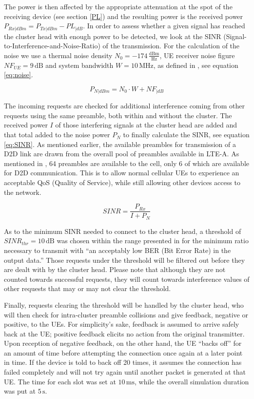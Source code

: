 The power is then affected by the appropriate attenuation at the spot of the receiving device (see section \ref{PL}) and the resulting power is the received power $P_{Rx|dBm} = P_{Tx|dBm} - PL_{|dB}$. In order to assess whether a given signal has reached the cluster head with enough power to be detected, we look at the SINR (Signal-to-Interference-and-Noise-Ratio) of the transmission. For the calculation of the noise we use a thermal noise density $N_0 = -174\,\frac{\text{dBm}}{\text{Hz}}$, UE receiver noise figure $NF_{UE} = 9\,\text{dB}$ and system bandwidth $W = 10\,\text{MHz}$, as defined in \cite{3rdGenerationPartnershipProject;2012}, see equation \ref{eq:noise}.

\begin{equation}\label{eq:noise}
P_{N|dBm} = N_0 \cdot W + NF_{|dB}
\end{equation} 

The incoming requests are checked for additional interference coming from other requests using the same preamble, both within and without the cluster. The received power $I$ of those interfering signals at the cluster head are added and that total added to the noise power $P_N$ to finally calculate the SINR, see equation \ref{eq:SINR}. As mentioned earlier, the available preambles for transmission of a D2D link are drawn from the overall pool of preambles available in LTE-A. As mentioned in \cite{Cox2012}, 64 preambles are available to the cell, only 6 of which are available for D2D communication. This is to allow normal cellular UEs to experience an acceptable QoS (Quality of Service), while still allowing other devices access to the network.

\begin{equation}\label{eq:SINR}
SINR = \frac {P_{Rx}} {I + P_N}
\end{equation}

As to the minimum SINR needed to connect to the cluster head, a threshold of $SINR_{thr} = 10\,\text{dB}$ was chosen within the range presented in \cite{3Gpp2009} for the minimum ratio necessary to transmit with ``an acceptably low BER (Bit Error Rate) in the output data.'' Those requests under the threshold will be filtered out before they are dealt with by the cluster head. Please note that although they are not counted towards successful requests, they will count towards interference values of other requests that may or may not clear the threshold.

Finally, requests clearing the threshold will be handled by the cluster head, who will then check for intra-cluster preamble collisions and give feedback, negative or positive, to the UEs. For simplicity's sake, feedback is assumed to arrive safely back at the UE; positive feedback elicits no action from the original transmitter. Upon reception of negative feedback, on the other hand, the UE ``backs off'' for an amount of time before attempting the connection once again at a later point in time. If the device is told to back off 20 times, it assumes the connection has failed completely and will not try again until another packet is generated at that UE. The time for each slot was set at $10\,\text{ms}$, while the overall simulation duration was put at $5\,\text{s}$.

